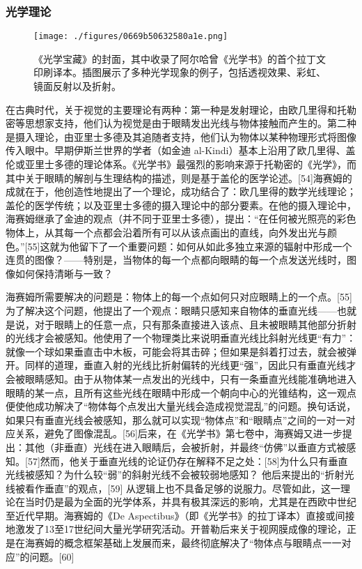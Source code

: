 \subsubsection{光学理论}
\begin{figure}[ht]
\centering
\texttt{[image: ./figures/0669b50632580a1e.png]}
\caption{《光学宝藏》的封面，其中收录了阿尔哈曾《光学书》的首个拉丁文印刷译本。插图展示了多种光学现象的例子，包括透视效果、彩虹、镜面反射以及折射。} \label{fig_YBH_1}
\end{figure}
在古典时代，关于视觉的主要理论有两种：第一种是发射理论，由欧几里得和托勒密等思想家支持，他们认为视觉是由于眼睛发出光线与物体接触而产生的。第二种是摄入理论，由亚里士多德及其追随者支持，他们认为物体以某种物理形式将图像传入眼中。早期伊斯兰世界的学者（如金迪 al-Kindi）基本上沿用了欧几里得、盖伦或亚里士多德的理论体系。《光学书》最强烈的影响来源于托勒密的《光学》，而其中关于眼睛的解剖与生理结构的描述，则是基于盖伦的医学论述。[54]海赛姆的成就在于，他创造性地提出了一个理论，成功结合了：欧几里得的数学光线理论；盖伦的医学传统；以及亚里士多德的摄入理论中的部分要素。在他的摄入理论中，海赛姆继承了金迪的观点（并不同于亚里士多德），提出：“在任何被光照亮的彩色物体上，从其每一个点都会沿着所有可以从该点画出的直线，向外发出光与颜色。”[55]这就为他留下了一个重要问题：如何从如此多独立来源的辐射中形成一个连贯的图像？——特别是，当物体的每一个点都向眼睛的每一个点发送光线时，图像如何保持清晰与一致？

海赛姆所需要解决的问题是：物体上的每一个点如何只对应眼睛上的一个点。[55]为了解决这个问题，他提出了一个观点：眼睛只感知来自物体的垂直光线——也就是说，对于眼睛上的任意一点，只有那条直接进入该点、且未被眼睛其他部分折射的光线才会被感知。他使用了一个物理类比来说明垂直光线比斜射光线更“有力”：就像一个球如果垂直击中木板，可能会将其击碎；但如果是斜着打过去，就会被弹开。同样的道理，垂直入射的光线比折射偏转的光线更“强”，因此只有垂直光线才会被眼睛感知。由于从物体某一点发出的光线中，只有一条垂直光线能准确地进入眼睛的某一点，且所有这些光线在眼睛中形成一个朝向中心的光锥结构，这一观点便使他成功解决了“物体每个点发出大量光线会造成视觉混乱”的问题。换句话说，如果只有垂直光线会被感知，那么就可以实现“物体点”和“眼睛点”之间的一对一对应关系，避免了图像混乱。[56]后来，在《光学书》第七卷中，海赛姆又进一步提出：其他（非垂直）光线在进入眼睛后，会被折射，并最终“仿佛”以垂直方式被感知。[57]然而，他关于垂直光线的论证仍存在解释不足之处：[58]为什么只有垂直光线被感知？为什么较“弱”的斜射光线不会被较弱地感知？
他后来提出的“折射光线被看作垂直”的观点，[59] 从逻辑上也不具备足够的说服力。尽管如此，这一理论在当时仍是最为全面的光学体系，并具有极其深远的影响，尤其是在西欧中世纪至近代早期。海赛姆的《De Aspectibus》（即《光学书》的拉丁译本）直接或间接地激发了13至17世纪间大量光学研究活动。开普勒后来关于视网膜成像的理论，正是在海赛姆的概念框架基础上发展而来，最终彻底解决了“物体点与眼睛点一一对应”的问题。[60]

